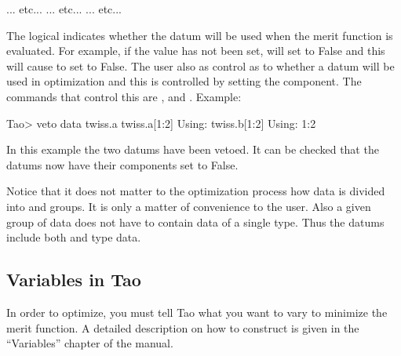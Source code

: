 \documentclass{hitec}     %
\begin{document}
{\begin{code}
... etc...
... etc...
... etc...
\end{code}
The  logical indicates whether the datum will be used when the merit function is
evaluated. For example, if the  value has not been set, \tao will set  to
False and this will cause \tao to set  to False. The user also as control as to whether
a datum will be used in optimization and this is controlled by setting the  component.
The commands that control this are ,  and . Example:
\begin{code}
Tao> veto data twiss.a
  twiss.a[1:2]                                   Using:
  twiss.b[1:2]                                   Using: 1:2
\end{code}
In this example the two  datums have been vetoed. It can be checked that the  datums
now have their  components set to False.

Notice that it does not matter to the optimization process how data is divided into  and
 groups. It is only a matter of convenience to the user. Also a given  group
of data does not have to contain data of a single type. Thus the  datums include both
 and  type data.

\subsection{Variables in Tao}
\label{s:var}

In order to optimize, you must tell Tao what  you want to vary to minimize the merit
function. A detailed description on how to construct  is given in the ``Variables''
chapter of the \tao manual.

}
\end{document}

